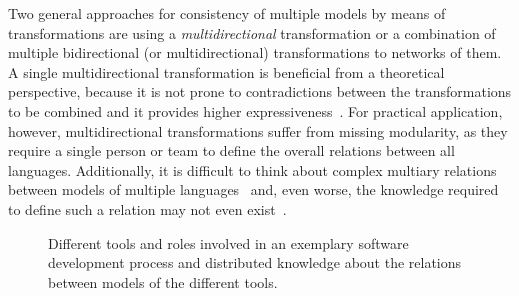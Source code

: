 Two general approaches for consistency of multiple %
models by means of transformations are using a \emph{multidirectional} transformation or a combination of multiple bidirectional (or multidirectional) transformations to networks of them.
A single multidirectional transformation is beneficial from a theoretical perspective, because it is not prone to contradictions between the transformations to be combined and it provides higher expressiveness~\cite{stevens2020BidirectionalTransformationLarge-SoSym}.
For practical application, however, multidirectional transformations suffer from missing modularity, as they require a single person or team to define the overall relations between all languages.
Additionally, it is difficult to think about complex multiary relations between models of multiple languages~\cite{stevens2020BidirectionalTransformationLarge-SoSym} and, even worse, the knowledge required to define such a relation may not even exist~.

\begin{figure}
    \centering
    
    \caption[Tools and distributed knowledge in engineering processes]{Different tools and roles involved in an exemplary software development process and distributed knowledge about the relations between models of the different tools.}
    \label{fig:introduction:distributed_knowledge}
\end{figure}

